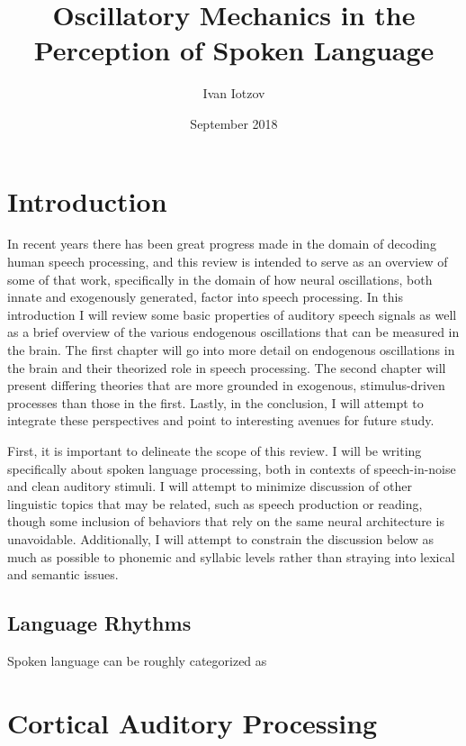 \documentclass[titlepage]{article}
\title{Oscillatory Mechanics in the Perception of Spoken Language}
\author{Ivan Iotzov}
\date{September 2018}
\begin{document}

\maketitle


\section{Introduction} \label{intro}

  In recent years there has been great progress made in the domain
  of decoding human speech processing, and this review is intended
  to serve as an overview of some of that work, specifically in the 
  domain of how neural oscillations, both innate and exogenously 
  generated, factor into speech processing. In this introduction I will review
  some basic properties of auditory speech signals as well as a brief overview 
  of the 
  various endogenous oscillations that can be measured in the brain. The first 
  chapter will go into more detail on endogenous oscillations in the brain and 
  their theorized role in speech processing. The second chapter will present 
  differing theories that are more grounded in exogenous, stimulus-driven 
  processes than those in the first. Lastly, in the conclusion, I will attempt
  to integrate these perspectives and point to interesting avenues for future
  study.

  First, it is important to delineate the scope of this review. I 
  will be writing specifically about spoken language processing, 
  both in contexts of speech-in-noise and clean auditory stimuli.
  I will attempt to minimize discussion of other linguistic topics that 
  may be related, such as speech production or reading, though some inclusion 
  of behaviors that rely on the same neural architecture is unavoidable.
  Additionally, I will attempt to constrain the discussion below as much as 
  possible to phonemic and syllabic levels rather than straying into lexical 
  and semantic issues.

  \subsection{Language Rhythms}

    Spoken language can be roughly categorized as 


\section{Cortical Auditory Processing} \label{corticalAuditoryProcessing}
\end{document}
